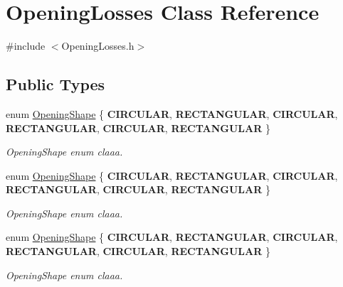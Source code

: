 \hypertarget{class_opening_losses}{}\section{Opening\+Losses Class Reference}
\label{class_opening_losses}


{\ttfamily \#include $<$Opening\+Losses.\+h$>$}

\subsection*{Public Types}
\begin{DoxyCompactItemize}
\item 
\mbox{\label{class_opening_losses_a57f9759b6fd72a1b75aa885800e26157}} 
enum \hyperlink{class_opening_losses_a57f9759b6fd72a1b75aa885800e26157}{Opening\+Shape} \{ \newline
{\bfseries C\+I\+R\+C\+U\+L\+AR}, 
{\bfseries R\+E\+C\+T\+A\+N\+G\+U\+L\+AR}, 
{\bfseries C\+I\+R\+C\+U\+L\+AR}, 
{\bfseries R\+E\+C\+T\+A\+N\+G\+U\+L\+AR}, 
\newline
{\bfseries C\+I\+R\+C\+U\+L\+AR}, 
{\bfseries R\+E\+C\+T\+A\+N\+G\+U\+L\+AR}
 \}\begin{DoxyCompactList}\small\item\em Opening\+Shape enum claaa. \end{DoxyCompactList}
\item 
\mbox{\label{class_opening_losses_a57f9759b6fd72a1b75aa885800e26157}} 
enum \hyperlink{class_opening_losses_a57f9759b6fd72a1b75aa885800e26157}{Opening\+Shape} \{ \newline
{\bfseries C\+I\+R\+C\+U\+L\+AR}, 
{\bfseries R\+E\+C\+T\+A\+N\+G\+U\+L\+AR}, 
{\bfseries C\+I\+R\+C\+U\+L\+AR}, 
{\bfseries R\+E\+C\+T\+A\+N\+G\+U\+L\+AR}, 
\newline
{\bfseries C\+I\+R\+C\+U\+L\+AR}, 
{\bfseries R\+E\+C\+T\+A\+N\+G\+U\+L\+AR}
 \}\begin{DoxyCompactList}\small\item\em Opening\+Shape enum claaa. \end{DoxyCompactList}
\item 
\mbox{\label{class_opening_losses_a57f9759b6fd72a1b75aa885800e26157}} 
enum \hyperlink{class_opening_losses_a57f9759b6fd72a1b75aa885800e26157}{Opening\+Shape} \{ \newline
{\bfseries C\+I\+R\+C\+U\+L\+AR}, 
{\bfseries R\+E\+C\+T\+A\+N\+G\+U\+L\+AR}, 
{\bfseries C\+I\+R\+C\+U\+L\+AR}, 
{\bfseries R\+E\+C\+T\+A\+N\+G\+U\+L\+AR}, 
\newline
{\bfseries C\+I\+R\+C\+U\+L\+AR}, 
{\bfseries R\+E\+C\+T\+A\+N\+G\+U\+L\+AR}
 \}\begin{DoxyCompactList}\small\item\em Opening\+Shape enum claaa. \end{DoxyCompactList}
\end{DoxyCompactItemize}

